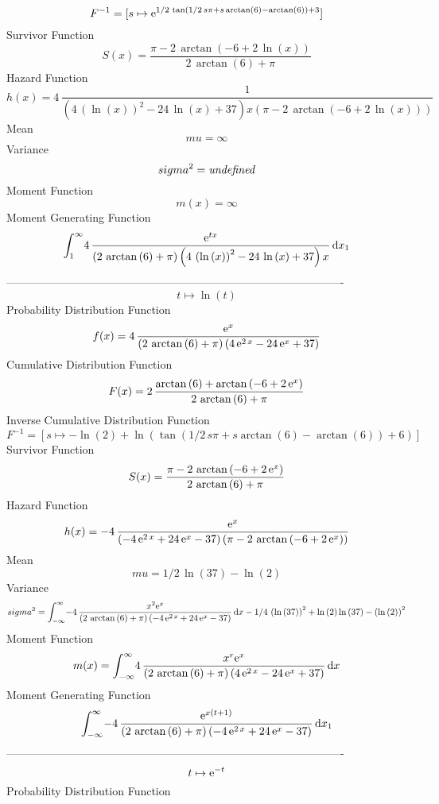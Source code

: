 \documentclass[12pt]{article}
\begin{document}
  $$F^{-1} = [s\mapsto {{\rm e}^{1/2\,\tan \left( 1/2\,s\pi+s\arctan \left( 6
 \right) -\arctan \left( 6 \right)  \right) +3}}]
$$Survivor Function 
 $$ S(x)={\frac {\pi-2\,\arctan \left( -6+2\,\ln  \left( x \right)  \right) }{2
\,\arctan \left( 6 \right) +\pi}}
$$ Hazard Function 
 $$ h(x)=4\,{\frac {1}{ \left( 4\, \left( \ln  \left( x \right)  \right) ^{2}-
24\,\ln  \left( x \right) +37 \right) x \left( \pi-2\,\arctan \left( -
6+2\,\ln  \left( x \right)  \right)  \right) }}
$$Mean 
 $$ mu=\infty 
$$ Variance 
 $$ sigma^2 = {\it undefined}
$$Moment Function 
 $$ m(x) = \infty 
$$ Moment Generating Function 
 $$\int_{1}^{\infty }\!4\,{\frac {{{\rm e}^{tx}}}{ \left( 2\,\arctan
 \left( 6 \right) +\pi \right)  \left( 4\, \left( \ln  \left( x
 \right)  \right) ^{2}-24\,\ln  \left( x \right) +37 \right) x}}
\,{\rm d}x_{{1}}
$$-------------------------------------------------------------------------------------------  \\$$t\mapsto \ln  \left( t \right) 
$$Probability Distribution Function 
$$  f(x)=4\,{\frac {{{\rm e}^{x}}}{ \left( 2\,\arctan \left( 6 \right) +\pi
 \right)  \left( 4\,{{\rm e}^{2\,x}}-24\,{{\rm e}^{x}}+37 \right) }}
$$Cumulative Distribution Function  
 $$F(x)=2\,{\frac {\arctan \left( 6 \right) +\arctan \left( -6+2\,{{\rm e}^{x}
} \right) }{2\,\arctan \left( 6 \right) +\pi}}
$$ Inverse Cumulative Distribution Function 
  $$F^{-1} = [s\mapsto -\ln  \left( 2 \right) +\ln  \left( \tan \left( 1/2\,s\pi+s
\arctan \left( 6 \right) -\arctan \left( 6 \right)  \right) +6
 \right) ]
$$Survivor Function 
 $$ S(x)={\frac {\pi-2\,\arctan \left( -6+2\,{{\rm e}^{x}} \right) }{2\,\arctan
 \left( 6 \right) +\pi}}
$$ Hazard Function 
 $$ h(x)=-4\,{\frac {{{\rm e}^{x}}}{ \left( -4\,{{\rm e}^{2\,x}}+24\,{{\rm e}^{
x}}-37 \right)  \left( \pi-2\,\arctan \left( -6+2\,{{\rm e}^{x}}
 \right)  \right) }}
$$Mean 
 $$ mu=1/2\,\ln  \left( 37 \right) -\ln  \left( 2 \right) 
$$ Variance 
 $$ sigma^2 = \int_{-\infty }^{\infty }\!-4\,{\frac {{x}^{2}{{\rm e}^{x}}}{ \left( 2
\,\arctan \left( 6 \right) +\pi \right)  \left( -4\,{{\rm e}^{2\,x}}+
24\,{{\rm e}^{x}}-37 \right) }}\,{\rm d}x-1/4\, \left( \ln  \left( 37
 \right)  \right) ^{2}+\ln  \left( 2 \right) \ln  \left( 37 \right) -
 \left( \ln  \left( 2 \right)  \right) ^{2}
$$Moment Function 
 $$ m(x) = \int_{-\infty }^{\infty }\!4\,{\frac {{x}^{r}{{\rm e}^{x}}}{ \left( 2
\,\arctan \left( 6 \right) +\pi \right)  \left( 4\,{{\rm e}^{2\,x}}-24
\,{{\rm e}^{x}}+37 \right) }}\,{\rm d}x
$$ Moment Generating Function 
 $$\int_{-\infty }^{\infty }\!-4\,{\frac {{{\rm e}^{x \left( t+1 \right) 
}}}{ \left( 2\,\arctan \left( 6 \right) +\pi \right)  \left( -4\,{
{\rm e}^{2\,x}}+24\,{{\rm e}^{x}}-37 \right) }}\,{\rm d}x_{{1}}
$$-------------------------------------------------------------------------------------------  \\$$t\mapsto {{\rm e}^{-t}}
$$Probability Distribution Function 
\end{document}
